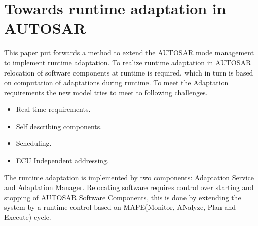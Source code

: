 \section{Towards runtime adaptation in AUTOSAR}
This paper put forwards a method to extend the AUTOSAR mode management to implement runtime adaptation.
To realize runtime adaptation in AUTOSAR relocation of software components at runtime is required, which in turn is based on computation of adaptations during runtime.
To meet the Adaptation requirements the new model tries to meet to following challenges.
\begin{itemize}
	\item Real time requirements.
	\item Self describing components.
	\item Scheduling.
	\item ECU Independent addressing.
\end{itemize}
The runtime adaptation is implemented by two components: Adaptation Service and Adaptation Manager.
Relocating software requires control over starting and stopping of AUTOSAR Software Components, this is done by extending the system by a runtime control based on MAPE(Monitor, ANalyze, Plan and Execute) cycle.


